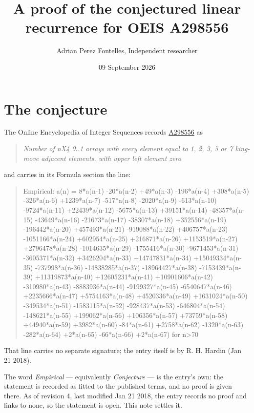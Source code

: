 \documentclass[11pt]{article}
\title{A proof of the conjectured linear recurrence for OEIS A298556}
\author{Adrian Perez Fontelles, Independent researcher}
\date{09 September 2026}
\theoremstyle{definition}
\begin{document}
\maketitle
\section{The conjecture}

The Online Encyclopedia of Integer Sequences records \href{https://oeis.org/A298556}{A298556} as

\begin{quote}\itshape Number of nX4 0..1 arrays with every element equal to 1, 2, 3, 5 or 7 king-move adjacent elements, with upper left element zero\end{quote}

and carries in its Formula section the line:

\begin{quote}\ttfamily Empirical: a(n) = 8*a(n-1) -20*a(n-2) +49*a(n-3) -196*a(n-4) +308*a(n-5) -326*a(n-6) +1239*a(n-7) -517*a(n-8) -2020*a(n-9) -613*a(n-10) -9724*a(n-11) +22439*a(n-12) -5675*a(n-13) +39151*a(n-14) -48357*a(n-15) -43649*a(n-16) -21673*a(n-17) -38307*a(n-18) +352556*a(n-19) -196442*a(n-20) +457493*a(n-21) -919088*a(n-22) +406757*a(n-23) -1051166*a(n-24) +602954*a(n-25) +216871*a(n-26) +1153519*a(n-27) +2796478*a(n-28) -1014635*a(n-29) -1755416*a(n-30) -9671453*a(n-31) -3605371*a(n-32) +3426204*a(n-33) +14747831*a(n-34) +15049334*a(n-35) -737998*a(n-36) -14838285*a(n-37) -18964427*a(n-38) -7153439*a(n-39) +11319873*a(n-40) +12605231*a(n-41) +10901606*a(n-42) -310980*a(n-43) -8883936*a(n-44) -9199327*a(n-45) -6540647*a(n-46) +2235666*a(n-47) +5754163*a(n-48) +4520336*a(n-49) +1631024*a(n-50) -349534*a(n-51) -1583115*a(n-52) -928437*a(n-53) -646804*a(n-54) -148621*a(n-55) +199062*a(n-56) +106356*a(n-57) +73759*a(n-58) +44940*a(n-59) +3982*a(n-60) -84*a(n-61) +2758*a(n-62) -1320*a(n-63) -282*a(n-64) +2*a(n-65) -66*a(n-66) +2*a(n-67) for n>70\end{quote}

That line carries no separate signature; the entry itself is by R. H. Hardin (Jan 21 2018).

The word {\itshape Empirical} --- equivalently {\itshape Conjecture} --- is the entry's own: the statement is recorded as fitted to the published terms, and no proof is given there. As of revision 4, last modified Jan 21 2018, the entry records no proof and links to none, so the statement is open. This note settles it.
\end{document}
